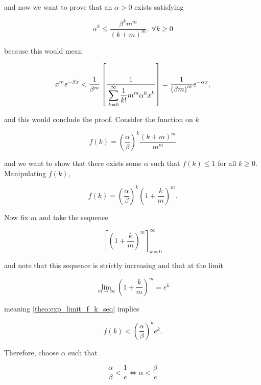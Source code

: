 	\noindent and now we want to prove that an $\alpha > 0$ exists satisfying

\begin{equation} \alpha^k \leq \dfrac{\beta^k m^m }{\left(k+m\right)^m},\ \forall k\geq 0 \end{equation}

	\noindent because this would mean 

\begin{equation} x^m e^{-\beta x} < \dfrac{1}{\beta^m} \left[\dfrac{1}{\raisebox{1mm}[3mm][0mm]{} \displaystyle\sum_{k=0}^\infty \dfrac{1}{k!} m^m \alpha^k x^k }\right] = \dfrac{1}{\left(\beta m\right)^m}e^{-\alpha x}, \end{equation}

	\noindent and this would conclude the proof. Consider the function on $k$ 

\begin{equation} f(k) = \left(\dfrac{\alpha}{\beta}\right)^k \dfrac{\left(k + m\right)^m}{m^m} \end{equation}

	\noindent and we want to show that there exists some $\alpha$ such that $f(k)\leq 1$ for all $k\geq 0$. Manipulating $f(k)$,

\begin{equation} f(k) = \left(\dfrac{\alpha}{\beta}\right)^k \left(1 + \dfrac{k}{m}\right)^m . \label{theo:exp_limit_f_k_seq}\end{equation}

	Now fix $m$ and take the sequence

\begin{equation} \left[\left(1 + \dfrac{k}{m}\right)^m\right]_{k=0}^\infty \end{equation}

	\noindent and note that this sequence is strictly increasing and that at the limit

\begin{equation} \lim_{m\to\infty} \left(1 + \dfrac{k}{m}\right)^m = e^k \end{equation}
	
	\noindent meaning \eqref{theo:exp_limit_f_k_seq} implies

\begin{equation} f(k) < \left(\dfrac{\alpha}{\beta}\right)^k e^k .\end{equation}

	Therefore, choose $\alpha$ such that

\begin{equation} \dfrac{\alpha}{\beta} < \dfrac{1}{e} \Leftrightarrow  \alpha < \dfrac{\beta}{e} \end{equation}

